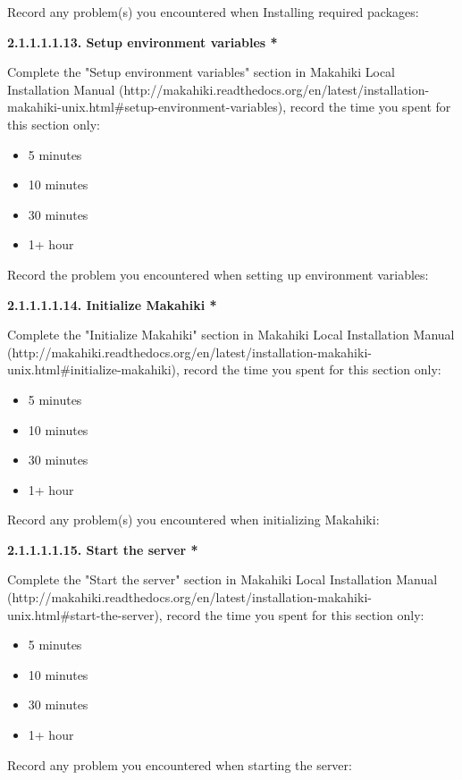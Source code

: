Record any problem(s) you encountered when Installing required packages:

{\bf 2.1.1.1.1.13. Setup environment variables *}

Complete the "Setup environment variables" section in Makahiki Local Installation Manual (http://makahiki.readthedocs.org/en/latest/installation-makahiki-unix.html\#setup-environment-variables), record the time you spent for this section only:

\begin{itemize}
\item 5 minutes
\item  10 minutes
\item  30 minutes
\item  1+ hour
\end{itemize}

Record the problem you encountered when setting up environment variables:

{\bf 2.1.1.1.1.14. Initialize Makahiki *}

Complete the "Initialize Makahiki" section in Makahiki Local Installation Manual (http://makahiki.readthedocs.org/en/latest/installation-makahiki-unix.html\#initialize-makahiki), record the time you spent for this section only:

\begin{itemize}
\item 5 minutes
\item  10 minutes
\item  30 minutes
\item  1+ hour
\end{itemize}

Record any problem(s) you encountered when initializing Makahiki:

{\bf 2.1.1.1.1.15. Start the server *}

Complete the "Start the server" section in Makahiki Local Installation Manual (http://makahiki.readthedocs.org/en/latest/installation-makahiki-unix.html\#start-the-server), record the time you spent for this section only:

\begin{itemize}
\item 5 minutes
\item  10 minutes
\item  30 minutes
\item  1+ hour
\end{itemize}

Record any problem you encountered when starting the server:

